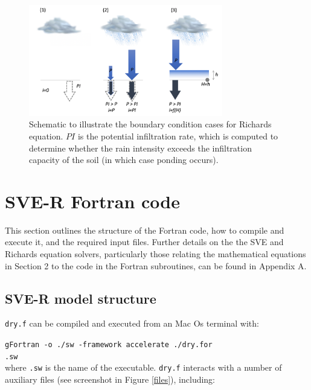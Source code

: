 \documentclass{article}
\newcommand{\code}[1]{\texttt{#1}}
\begin{document}
 	
 \begin{figure}[h]
 \centering
\includegraphics[width=20pc]{grid/richards.png}
 \caption{Schematic to illustrate the boundary condition cases for Richards equation. $PI$ is the potential infiltration rate, which is computed to determine whether the rain intensity exceeds the infiltration capacity of the soil (in which case ponding occurs).}
 \label{richardgrid}
 \end{figure}	


\newpage

\section{SVE-R Fortran code}

This section outlines the structure of the Fortran code, how to compile and execute it, and the required input files.  Further details on the the SVE and Richards equation solvers, particularly those relating the mathematical equations in Section 2 to the code in the Fortran subroutines, can be found in Appendix A.

\label{SVE_solver}


\subsection{SVE-R model structure}

\code{dry.f} can be compiled and executed from an Mac Os terminal with:

\hspace*{8mm} \code{gFortran -o ./sw  -framework accelerate ./dry.for} \\
\hspace*{8mm} \code{.sw} \\

 where \code{.sw} is the name of the executable.  \code{dry.f} interacts with a number of auxiliary files (see screenshot in Figure \ref{files}), including:
\end{document}
